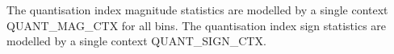 The quantisation index magnitude statistics are modelled by a single
context QUANT\_MAG\_CTX for all bins. The quantisation index sign
statistics are modelled by a single context QUANT\_SIGN\_CTX.

